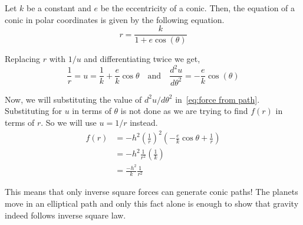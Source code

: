 \documentclass[a4paper, 12pt]{article}
\renewcommand{\indent}{\hspace{3ex}}
\newcommand{\ddthII}[1]{\frac{d^2#1}{d\theta^2}}
\begin{document}
\indent Let $k$ be a constant and $e$ be the eccentricity of a conic. Then, the equation of a conic in polar coordinates is given by the following equation.
\[ r = \frac{k}{1 + e \cos(\theta)} \]

Replacing $r$ with $1/u$ and differentiating twice we get,
\[ \frac{1}{r} = u =  \frac{1}{k} + \frac{e}{k} \cos{\theta} \quad\text{and}\quad \ddthII{u} = - \frac{e}{k} \cos(\theta) \]

Now, we will substituting the value of ${d^2u}/{d\theta}^2$ in~\eqref{eq:force from path}. Substituting for $u$ in terms of $\theta$ is not done as we are trying to find $f(r)$ in terms of $r$. So we will use $u = 1/r$ instead.
\begin{align*}
	f(r) &= - h^2 {\left( \frac{1}{r} \right)}^2 \left( - \frac{e}{k} \cos{\theta} + \frac{1}{r} \right) \\
		 &= - h^2 \frac{1}{r^2} \left( \frac{1}{k}\right) \\
		 &= \frac{-h^2}{k} \frac{1}{r^2}
\end{align*}

\indent This means that only inverse square forces can generate conic paths! The planets move in an elliptical path and only this fact alone is enough to show that gravity indeed follows inverse square law.

\end{document}
